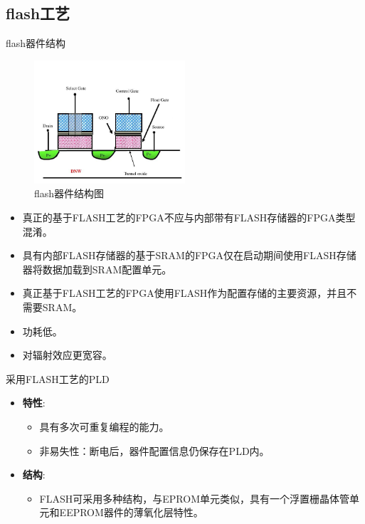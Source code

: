 \subsection{flash工艺}
\begin{frame}[allowframebreaks]{flash器件结构}

\begin{figure}
    \centering
    \includegraphics[width=0.5\textwidth]{img1/flash.png}
    \caption{flash器件结构图}
\end{figure}

\begin{itemize}
\tightlist
\item
    真正的基于FLASH工艺的FPGA不应与内部带有FLASH存储器的FPGA类型混淆。\\
\item
    具有内部FLASH存储器的基于SRAM的FPGA仅在启动期间使用FLASH存储器将数据加载到SRAM配置单元。\\
\item
    真正基于FLASH工艺的FPGA使用FLASH作为配置存储的主要资源，并且不需要SRAM。\\
\item
    功耗低。\\
\item
    对辐射效应更宽容。
\end{itemize}
\end{frame}

\begin{frame}{采用FLASH工艺的PLD}
\begin{itemize}
\tightlist
\item
    \textbf{特性}:

    \begin{itemize}
    \tightlist
    \item
    具有多次可重复编程的能力。\\
    \item
    非易失性：断电后，器件配置信息仍保存在PLD内。
    \end{itemize}
\item
    \textbf{结构}:

    \begin{itemize}
    \tightlist
    \item
    FLASH可采用多种结构，与EPROM单元类似，具有一个浮置栅晶体管单元和EEPROM器件的薄氧化层特性。
    \end{itemize}
\end{itemize}
\end{frame}

